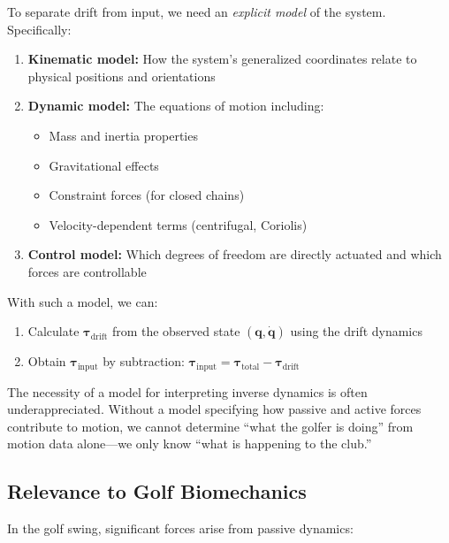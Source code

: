 \documentclass[11pt,a4paper]{article}
\newcommand{\bvec}[1]{\mathbf{#1}}
\theoremstyle{definition}
\theoremstyle{plain}
\begin{document}
To separate drift from input, we need an \emph{explicit model} of the system. Specifically:

\begin{enumerate}
    \item \textbf{Kinematic model:} How the system's generalized coordinates relate to physical positions and orientations
    
    \item \textbf{Dynamic model:} The equations of motion including:
    \begin{itemize}
        \item Mass and inertia properties
        \item Gravitational effects
        \item Constraint forces (for closed chains)
        \item Velocity-dependent terms (centrifugal, Coriolis)
    \end{itemize}
    
    \item \textbf{Control model:} Which degrees of freedom are directly actuated and which forces are controllable
\end{enumerate}

With such a model, we can:
\begin{enumerate}
    \item Calculate $\bvec{\tau}_{\text{drift}}$ from the observed state $(\bvec{q}, \dot{\bvec{q}})$ using the drift dynamics
    \item Obtain $\bvec{\tau}_{\text{input}}$ by subtraction: $\bvec{\tau}_{\text{input}} = \bvec{\tau}_{\text{total}} - \bvec{\tau}_{\text{drift}}$
\end{enumerate}

\begin{keypoint}
The necessity of a model for interpreting inverse dynamics is often underappreciated. Without a model specifying how passive and active forces contribute to motion, we cannot determine ``what the golfer is doing'' from motion data alone—we only know ``what is happening to the club.''
\end{keypoint}

\subsection{Relevance to Golf Biomechanics}

In the golf swing, significant forces arise from passive dynamics:
\end{document}
